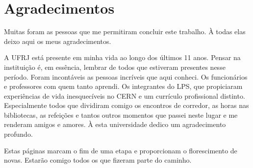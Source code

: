 \chapter*{Agradecimentos}

Muitas foram as pessoas que me permitiram concluir este trabalho.
À todas elas deixo aqui os meus agradecimentos.

A UFRJ está presente em minha vida ao longo dos últimos 11 anos.
Pensar na instituição é, em essência, lembrar de todos que estiveram presentes nesse período.
Foram incontáveis as pessoas incríveis que aqui conheci.
Os funcionários e professores com quem tanto aprendi.
Os integrantes do LPS, que propiciaram experiências de vida inesquecíveis no CERN e um currículo profissional distinto.
Especialmente todos que dividiram comigo os encontros de corredor, as horas nas bibliotecas, as refeições e tantos outros momentos que passei neste lugar e me renderam amigos e amores.
À esta universidade dedico um agradecimento profundo.

Estas páginas marcam o fim de uma etapa e proporcionam o florescimento de novas.
Estarão comigo todos os que fizeram parte do caminho.
